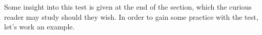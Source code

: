 \documentclass{ximera}
\begin{document}
Some insight into this test is given at the end of the section, which the curious reader may study should they wish.  In order to gain some practice with the test, let's work an example.

%
%
%
%
%
%
%
%
%
%
%
%
\end{document}
